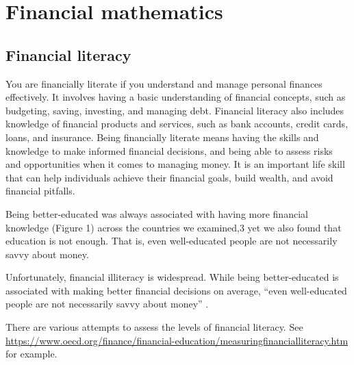 \chapter{Financial mathematics}\label{decision-making-and-money}


\section{Financial literacy}\label{financial-literacy}

You are financially literate if you understand and manage personal finances effectively. It involves having a basic understanding of financial concepts, such as budgeting, saving, investing, and managing debt. Financial literacy also includes knowledge of financial products and services, such as bank accounts, credit cards, loans, and insurance.
Being financially literate means having the skills and knowledge to make informed financial decisions, and being able to assess risks and opportunities when it comes to managing money. It is an important life skill that can help individuals achieve their financial goals, build wealth, and avoid financial pitfalls.

Being better-educated was always associated with having more financial knowledge (Figure
1) across the countries we examined,3 yet we also found that education is not enough. That
is, even well-educated people are not necessarily savvy about money.

Unfortunately, financial illiteracy is widespread. While being better-educated is associated with making better financial decisions on average, ``even well-educated people are not necessarily savvy about money'' \citep[p.~3]{Mitchell2015Financial}.

There are various attempts to assess the levels of financial literacy. See \url{https://www.oecd.org/finance/financial-education/measuringfinancialliteracy.htm} for example.

